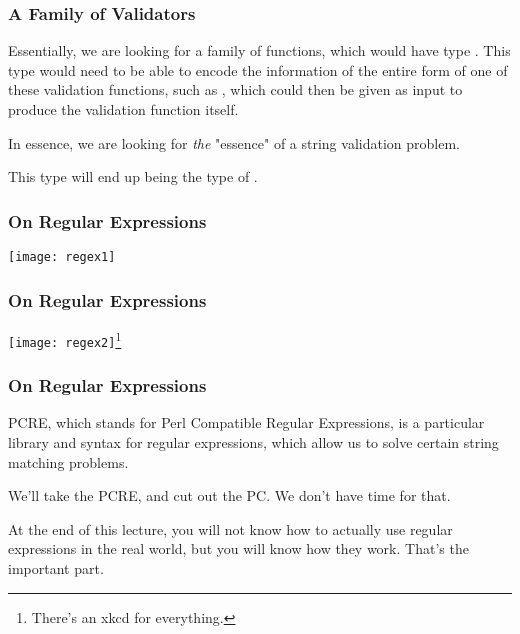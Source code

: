 \documentclass[aspectratio=169, handout]{beamer}
\begin{document}
\begin{frame}[fragile]
  \frametitle{A Family of Validators}

  Essentially, we are looking for a family of functions, which would have
  type . This type  would need to be able
  to encode the information of the entire form of one of these validation functions,
  such as , which could then be given as input to produce the
  validation function itself.

  \pause
  \vspace{\fill}

  In essence, we are looking for \textit{the} "essence" of a string validation problem.

  \pause
  \vspace{\fill}

  This type  will end up being the type of .
\end{frame}


\begin{frame}[fragile]
  \frametitle{On Regular Expressions}

  \begin{center}
    \texttt{[image: regex1]}
  \end{center}
\end{frame}

\begin{frame}[fragile]
  \frametitle{On Regular Expressions}

  \begin{center}
    \texttt{[image: regex2]}\footnote{There's an xkcd for everything.}
  \end{center}
\end{frame}

\begin{frame}[fragile]
  \frametitle{On Regular Expressions}

  PCRE, which stands for Perl Compatible Regular Expressions, is a particular
  library and syntax for regular expressions, which allow us to solve certain
  string matching problems.

  \pause
  \vspace{\fill}

  We'll take the PCRE, and cut out the PC. We don't have time for that.

  \pause
  \vspace{\fill}

  At the end of this lecture, you will not know how to actually use regular
  expressions in the real world, but you will know how they work.
  That's the important part.
\end{frame}
\end{document}
